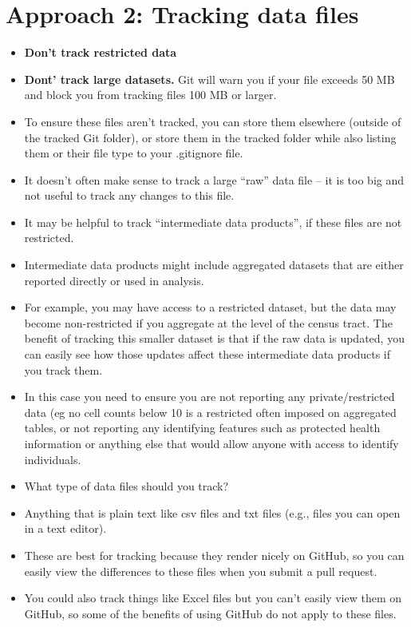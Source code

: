 \documentclass[
]{book}
\begin{document}
\hypertarget{approach-2-tracking-data-files}{%
\section{Approach 2: Tracking data files}\label{approach-2-tracking-data-files}}

\begin{itemize}
\item
  \textbf{Don't track restricted data}
\item
  \textbf{Dont' track large datasets.} Git will warn you if your file exceeds 50 MB and
  block you from tracking files 100 MB or larger.
\item
  To ensure these files aren't tracked, you can store them elsewhere (outside of
  the tracked Git folder), or store them in the tracked folder while also listing
  them or their file type to your .gitignore file.
\item
  It doesn't often make sense to track a large ``raw'' data file -- it is too big
  and not useful to track any changes to this file.
\item
  It may be helpful to track ``intermediate data products'', if these files are
  not restricted.\\
\item
  Intermediate data products might include aggregated datasets
  that are either reported directly or used in analysis.
\item
  For example, you may have access to a restricted dataset, but the data may
  become non-restricted if you aggregate at the level of the census tract. The
  benefit of tracking this smaller dataset is that if the raw data is updated, you
  can easily see how those updates affect these intermediate data products if you
  track them.
\item
  In this case you need to ensure you are not reporting any private/restricted
  data (eg no cell counts below 10 is a restricted often imposed on aggregated
  tables, or not reporting any identifying features such as protected health
  information or anything else that would allow anyone with access to identify
  individuals.
\item
  What type of data files should you track?
\item
  Anything that is plain text like csv files and txt files (e.g., files you can
  open in a text editor).
\item
  These are best for tracking because they render nicely on GitHub, so you can
  easily view the differences to these files when you submit a pull request.
\item
  You could also track things like Excel files but you can't easily view them
  on GitHub, so some of the benefits of using GitHub do not apply to these files.
\end{itemize}
\end{document}
